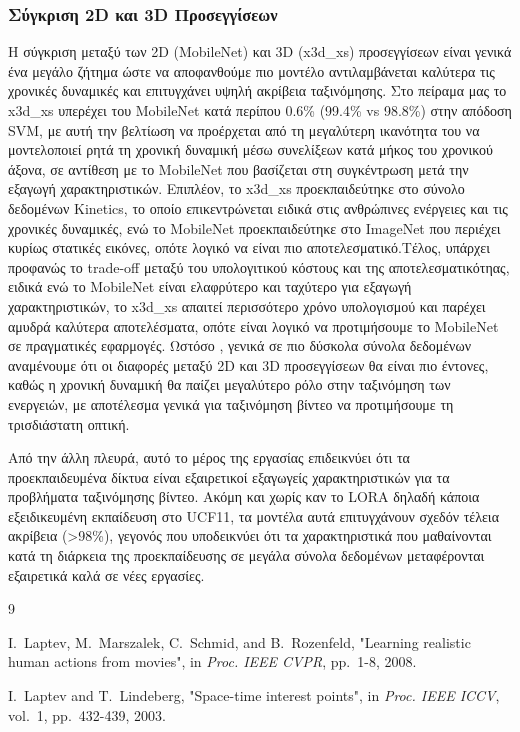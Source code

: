 \documentclass[12pt, a4paper]{article}
\begin{document}
\subsubsection{Σύγκριση 2D και 3D Προσεγγίσεων}

Η σύγκριση μεταξύ των 2D (MobileNet) και 3D (x3d\_xs) προσεγγίσεων είναι γενικά ένα μεγάλο ζήτημα ώστε να αποφανθούμε πιο μοντέλο αντιλαμβάνεται καλύτερα τις χρονικές δυναμικές και  επιτυγχάνει υψηλή ακρίβεια ταξινόμησης.  Στο πείραμα μας το x3d\_xs υπερέχει του MobileNet κατά περίπου 0.6\% (99.4\% vs 98.8\%) στην απόδοση SVM, με αυτή την βελτίωση να προέρχεται από τη μεγαλύτερη ικανότητα του να μοντελοποιεί ρητά τη χρονική δυναμική μέσω συνελίξεων κατά μήκος του χρονικού άξονα, σε αντίθεση με το MobileNet που βασίζεται στη συγκέντρωση μετά την εξαγωγή χαρακτηριστικών. Επιπλέον, το x3d\_xs προεκπαιδεύτηκε στο σύνολο δεδομένων Kinetics, το οποίο επικεντρώνεται ειδικά στις ανθρώπινες ενέργειες και τις χρονικές δυναμικές, ενώ το MobileNet προεκπαιδεύτηκε στο ImageNet που περιέχει κυρίως στατικές εικόνες, οπότε λογικό να είναι πιο αποτελεσματικό.Τέλος, υπάρχει προφανώς το trade-off μεταξύ του υπολογιτικού κόστους και της αποτελεσματικότηας, ειδικά ενώ το MobileNet είναι ελαφρύτερο και ταχύτερο για εξαγωγή χαρακτηριστικών, το x3d\_xs απαιτεί περισσότερο χρόνο υπολογισμού και παρέχει αμυδρά καλύτερα αποτελέσματα, οπότε 
είναι λογικό να προτιμήσουμε το MobileNet σε πραγματικές εφαρμογές. Ωστόσο , γενικά σε πιο δύσκολα σύνολα δεδομένων αναμένουμε ότι οι διαφορές μεταξύ 2D και 3D προσεγγίσεων θα είναι πιο έντονες, καθώς η χρονική δυναμική θα παίζει μεγαλύτερο ρόλο στην ταξινόμηση των ενεργειών, με αποτέλεσμα γενικά για ταξινόμηση βίντεο να προτιμήσουμε τη τρισδιάστατη οπτική.

Από την άλλη πλευρά, αυτό το μέρος της εργασίας επιδεικνύει ότι τα προεκπαιδευμένα δίκτυα είναι εξαιρετικοί εξαγωγείς χαρακτηριστικών για τα προβλήματα ταξινόμησης βίντεο.
Ακόμη και χωρίς καν το LORA δηλαδή κάποια εξειδικευμένη εκπαίδευση στο UCF11, τα μοντέλα αυτά επιτυγχάνουν σχεδόν τέλεια ακρίβεια (>98\%), γεγονός που υποδεικνύει ότι τα χαρακτηριστικά που μαθαίνονται
κατά τη διάρκεια της προεκπαίδευσης σε μεγάλα σύνολα δεδομένων μεταφέρονται εξαιρετικά καλά σε νέες εργασίες.  

\begin{thebibliography}{9}

I.~Laptev, M.~Marszalek, C.~Schmid, and B.~Rozenfeld,
"Learning realistic human actions from movies",
in \textit{Proc. IEEE CVPR}, pp.~1-8, 2008.

I.~Laptev and T.~Lindeberg,
"Space-time interest points",
in \textit{Proc. IEEE ICCV}, vol.~1, pp.~432-439, 2003.

\end{thebibliography}
\end{document}
